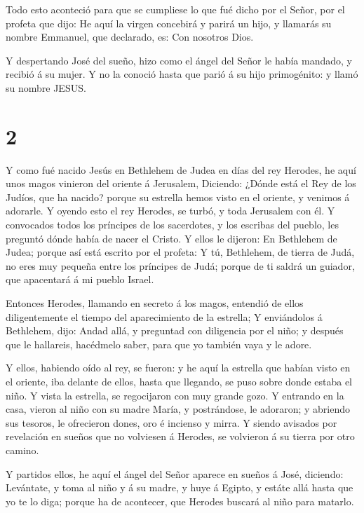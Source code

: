  Todo esto aconteció para que se cumpliese lo que fué dicho
por el Señor, por el profeta que dijo:  He aquí la virgen
concebirá y parirá un hijo, y llamarás su nombre Emmanuel, que
declarado, es: Con nosotros Dios.

 Y despertando José del sueño, hizo como el ángel del Señor
le había mandado, y recibió á su mujer.  Y no la conoció
hasta que parió á su hijo primogénito: y llamó su nombre JESUS.

\hypertarget{section-1}{%
\section{2}\label{section-1}}

 Y como fué nacido Jesús en Bethlehem de Judea en días del
rey Herodes, he aquí unos magos vinieron del oriente á Jerusalem,
 Diciendo: ¿Dónde está el Rey de los Judíos, que ha nacido?
porque su estrella hemos visto en el oriente, y venimos á adorarle.
 Y oyendo esto el rey Herodes, se turbó, y toda Jerusalem
con él.  Y convocados todos los príncipes de los sacerdotes,
y los escribas del pueblo, les preguntó dónde había de nacer el Cristo.
 Y ellos le dijeron: En Bethlehem de Judea; porque así está
escrito por el profeta:  Y tú, Bethlehem, de tierra de Judá,
no eres muy pequeña entre los príncipes de Judá; porque de ti saldrá un
guiador, que apacentará á mi pueblo Israel.

 Entonces Herodes, llamando en secreto á los magos, entendió
de ellos diligentemente el tiempo del aparecimiento de la estrella;
 Y enviándolos á Bethlehem, dijo: Andad allá, y preguntad
con diligencia por el niño; y después que le hallareis, hacédmelo saber,
para que yo también vaya y le adore.

 Y ellos, habiendo oído al rey, se fueron: y he aquí la
estrella que habían visto en el oriente, iba delante de ellos, hasta que
llegando, se puso sobre donde estaba el niño.  Y vista la
estrella, se regocijaron con muy grande gozo.  Y entrando
en la casa, vieron al niño con su madre María, y postrándose, le
adoraron; y abriendo sus tesoros, le ofrecieron dones, oro é incienso y
mirra.  Y siendo avisados por revelación en sueños que no
volviesen á Herodes, se volvieron á su tierra por otro camino.

 Y partidos ellos, he aquí el ángel del Señor aparece en
sueños á José, diciendo: Levántate, y toma al niño y á su madre, y huye
á Egipto, y estáte allá hasta que yo te lo diga; porque ha de acontecer,
que Herodes buscará al niño para matarlo.

